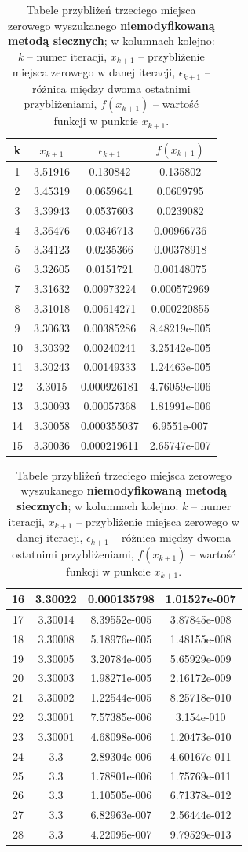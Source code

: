 \begin{table}[!htp]
	\centering
	\label{pierwszetrzecie}
	\caption{Tabele przybliżeń trzeciego miejsca zerowego wyszukanego \textbf{niemodyfikowaną metodą siecznych}; w kolumnach kolejno: $ k $ – numer iteracji, $ x_{k+1} $ – przybliżenie miejsca zerowego w danej iteracji, $\epsilon_{k+1}$ – różnica między dwoma ostatnimi przybliżeniami, $ f(x_{k+1}) $ – wartość funkcji w punkcie $ x_{k+1} $.}
	\begin{tabular}{|c|c|c|c|}
		\hline
	k&$x_{k+1}$&$\epsilon_{k+1} $&$ f(x_{k+1})$ \\ \hline
	1&3.51916&0.130842&0.135802 \\ \hline
	2&3.45319&0.0659641&0.0609795 \\ \hline
	3&3.39943&0.0537603&0.0239082 \\ \hline
	4&3.36476&0.0346713&0.00966736 \\ \hline
	5&3.34123&0.0235366&0.00378918 \\ \hline
	6&3.32605&0.0151721&0.00148075 \\ \hline
	7&3.31632&0.00973224&0.000572969 \\ \hline
	8&3.31018&0.00614271&0.000220855 \\ \hline
	9&3.30633&0.00385286&8.48219e-005 \\ \hline
	10&3.30392&0.00240241&3.25142e-005 \\ \hline
	11&3.30243&0.00149333&1.24463e-005 \\ \hline
	12&3.3015&0.000926181&4.76059e-006 \\ \hline
	13&3.30093&0.00057368&1.81991e-006 \\ \hline
	14&3.30058&0.000355037&6.9551e-007 \\ \hline
	15&3.30036&0.000219611&2.65747e-007 \\ 
	\end{tabular}
	\begin{tabular}{|c|c|c|c|}
	16&3.30022&0.000135798&1.01527e-007 \\ \hline
	17&3.30014&8.39552e-005&3.87845e-008 \\ \hline
	18&3.30008&5.18976e-005&1.48155e-008 \\ \hline
	19&3.30005&3.20784e-005&5.65929e-009 \\ \hline
	20&3.30003&1.98271e-005&2.16172e-009 \\ \hline
	21&3.30002&1.22544e-005&8.25718e-010 \\ \hline
	22&3.30001&7.57385e-006&3.154e-010 \\ \hline
	23&3.30001&4.68098e-006&1.20473e-010 \\ \hline
	24&3.3&2.89304e-006&4.60167e-011 \\ \hline
	25&3.3&1.78801e-006&1.75769e-011 \\ \hline
	26&3.3&1.10505e-006&6.71378e-012 \\ \hline
	27&3.3&6.82963e-007&2.56444e-012 \\ \hline
	28&3.3&4.22095e-007&9.79529e-013 \\ \hline
	\end{tabular}
\end{table}
